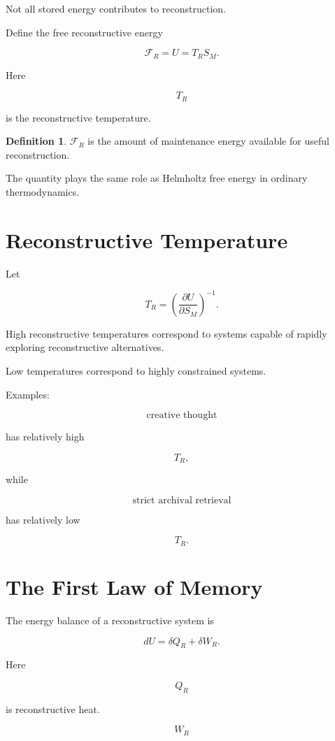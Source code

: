 \documentclass[12pt,oneside]{book}
\theoremstyle{plain} \newtheorem{theorem}{Theorem}[chapter] \newtheorem{lemma}[theorem]{Lemma} \newtheorem{proposition}[theorem]{Proposition} \newtheorem{corollary}[theorem]{Corollary}
\theoremstyle{definition} \newtheorem{definition}[theorem]{Definition} \newtheorem{axiom}[theorem]{Axiom} \newtheorem{construction}[theorem]{Construction}
\theoremstyle{remark} \newtheorem{remark}[theorem]{Remark} \newtheorem{example}[theorem]{Example}
\begin{document}
Not all stored energy contributes to reconstruction.

Define the free reconstructive energy

\[
\mathcal F_R
=
U
=
T_R S_M.
\]

Here

\[
T_R
\]

is the reconstructive temperature.

\begin{definition}

$\mathcal F_R$ is the amount of maintenance energy available for useful reconstruction.

\end{definition}

The quantity plays the same role as Helmholtz free energy in ordinary thermodynamics.

\section{Reconstructive Temperature}

Let

\[
T_R
=
\left(
\frac{\partial U}
{\partial S_M}
\right)^{-1}.
\]

High reconstructive temperatures correspond to systems capable of rapidly exploring reconstructive alternatives.

Low temperatures correspond to highly constrained systems.

Examples:

\[
\text{creative thought}
\]

has relatively high

\[
T_R,
\]

while

\[
\text{strict archival retrieval}
\]

has relatively low

\[
T_R.
\]

\section{The First Law of Memory}

The energy balance of a reconstructive system is

\[
dU
=
\delta Q_R
+
\delta W_R.
\]

Here

\[
Q_R
\]

is reconstructive heat.

\[
W_R
\]
\end{document}
